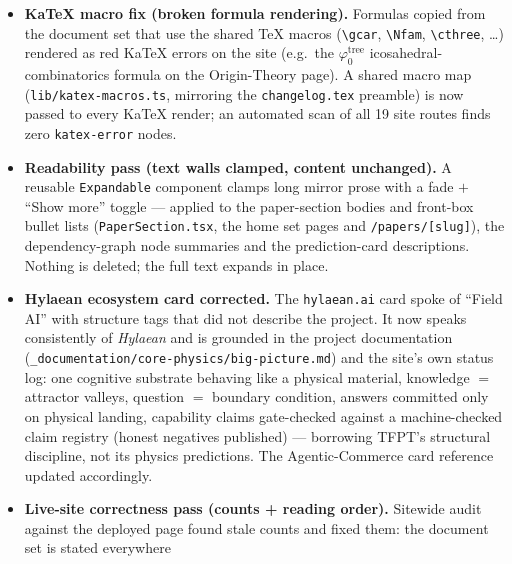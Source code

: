 \begin{itemize}[leftmargin=1.5em]
certification step (Kronheimer \texttt{v479}, four-interval \texttt{v480}, crossed-product
\texttt{v469}) with sub-text wrapping fixed; figures regenerated (PDF + website PNG). The
stale figure captions updated: \texttt{introduction} (timeline caption now spans the full
arc), \texttt{tfpt\_research\_contracts} (residual-chain caption now states the
\texttt{SEAM.EQUIV.01} bedrock and certification round; QFT-skeleton caption now names the
one \mO\ residual instead of the outdated ``two open items''). No numbers, statuses or
claims change anywhere.
\item \textbf{KaTeX macro fix (broken formula rendering).} Formulas copied from the document
set that use the shared TeX macros (\texttt{\textbackslash gcar},
\texttt{\textbackslash Nfam}, \texttt{\textbackslash cthree}, \dots) rendered as red KaTeX
errors on the site (e.g.\ the $\varphi_0^{\mathrm{tree}}$ icosahedral-combinatorics formula
on the Origin-Theory page). A shared macro map (\texttt{lib/katex-macros.ts}, mirroring the
\texttt{changelog.tex} preamble) is now passed to every KaTeX render; an automated scan of
all 19 site routes finds zero \texttt{katex-error} nodes.
\item \textbf{Readability pass (text walls clamped, content unchanged).} A reusable
\texttt{Expandable} component clamps long mirror prose with a fade $+$ ``Show more'' toggle
--- applied to the paper-section bodies and front-box bullet lists
(\texttt{PaperSection.tsx}, the home set pages and \texttt{/papers/[slug]}), the
dependency-graph node summaries and the prediction-card descriptions. Nothing is deleted;
the full text expands in place.
\item \textbf{Hylaean ecosystem card corrected.} The \texttt{hylaean.ai} card spoke of
``Field AI'' with structure tags that did not describe the project. It now speaks
consistently of \emph{Hylaean} and is grounded in the project documentation
(\texttt{\_documentation/core-physics/big-picture.md}) and the site's own status log: one
cognitive substrate behaving like a physical material, knowledge $=$ attractor valleys,
question $=$ boundary condition, answers committed only on physical landing, capability
claims gate-checked against a machine-checked claim registry (honest negatives published) ---
borrowing TFPT's structural discipline, not its physics predictions. The Agentic-Commerce
card reference updated accordingly.
\item \textbf{Live-site correctness pass (counts + reading order).} Sitewide audit against
the deployed page found stale counts and fixed them: the document set is stated everywhere

\end{itemize}
